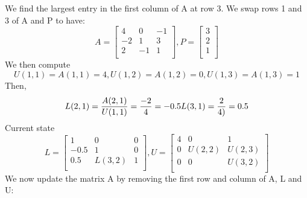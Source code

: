 \documentclass{article}
\DeclareMathOperator{\1}{\mathit{1}}
\numberwithin{figure}{section} %
\begin{document}
We find the largest entry in the first column of A at row 3. We swap rows 1 and 3 of A and P to have:
    \[
        A =
        \begin{bmatrix}
            4 & 0 & -1 \\
            -2 & 1 & 3 \\
            2 & -1 & 1 \\
        \end{bmatrix},
        P = 
            \begin{bmatrix}
                3 \\
                2 \\
                1 \\
            \end{bmatrix}
    \]
We then compute
    \[
        U(1,1) = A(1,1) = 4, U(1,2) = A(1,2) =0, U(1,3) = A(1,3) = 1
    \]
Then,
    \[
        L(2,1) = \frac{A(2,1)}{U(1,1)} = \frac{-2}{4} = -0.5 \\
        L(3,1) = \frac{2}{4)} = 0.5
    \]
Current state
    \[
        L=
            \begin{bmatrix}
                1 & 0 & 0 \\
                -0.5 & 1 & 0 \\
                0.5 & L(3,2) & 1 \\
            \end{bmatrix},
        U =
            \begin{bmatrix}
                4 & 0 & 1 \\
                0 & U(2,2) & U(2,3) \\
                0 & 0 & U(3,2) \\
            \end{bmatrix}
    \]
We now update the matrix A by removing the first row and column of A, L and U:
\end{document}

